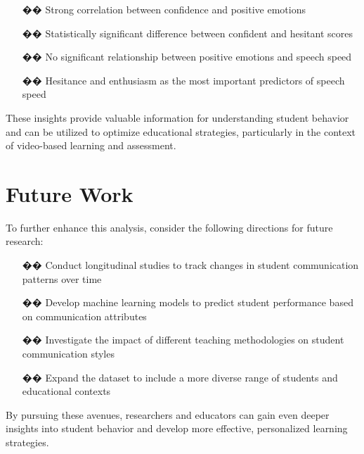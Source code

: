 \documentclass{article}
\begin{document}
\begin{enumerate}
    \item [\textcolor{accentColor1}{��}] Strong correlation between confidence and positive emotions
    \item [\textcolor{accentColor2}{��}] Statistically significant difference between confident and hesitant scores
    \item [\textcolor{accentColor3}{��️}] No significant relationship between positive emotions and speech speed
    \item [\textcolor{primaryColor}{��}] Hesitance and enthusiasm as the most important predictors of speech speed
\end{enumerate}

These insights provide valuable information for understanding student behavior and can be utilized to optimize educational strategies, particularly in the context of video-based learning and assessment.

\section{Future Work}
To further enhance this analysis, consider the following directions for future research:

\begin{enumerate}
    \item [\textcolor{accentColor1}{��}] Conduct longitudinal studies to track changes in student communication patterns over time
    \item [\textcolor{accentColor2}{��}] Develop machine learning models to predict student performance based on communication attributes
    \item [\textcolor{accentColor3}{��}] Investigate the impact of different teaching methodologies on student communication styles
    \item [\textcolor{primaryColor}{��}] Expand the dataset to include a more diverse range of students and educational contexts
\end{enumerate}

By pursuing these avenues, researchers and educators can gain even deeper insights into student behavior and develop more effective, personalized learning strategies.
\end{document}
